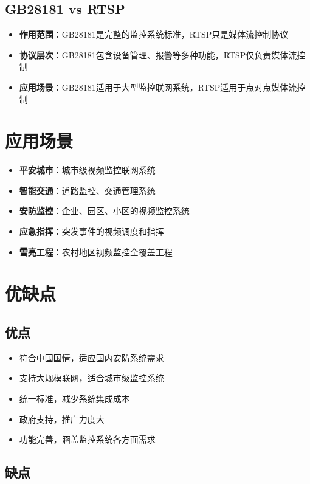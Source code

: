 \documentclass[12pt,UTF8]{ctexbook}
\begin{document}
\section{GB28181 vs RTSP}

\begin{itemize}
  \item \textbf{作用范围}：GB28181是完整的监控系统标准，RTSP只是媒体流控制协议
  \item \textbf{协议层次}：GB28181包含设备管理、报警等多种功能，RTSP仅负责媒体流控制
  \item \textbf{应用场景}：GB28181适用于大型监控联网系统，RTSP适用于点对点媒体流控制
\end{itemize}

\chapter{应用场景}

\begin{itemize}
  \item \textbf{平安城市}：城市级视频监控联网系统
  \item \textbf{智能交通}：道路监控、交通管理系统
  \item \textbf{安防监控}：企业、园区、小区的视频监控系统
  \item \textbf{应急指挥}：突发事件的视频调度和指挥
  \item \textbf{雪亮工程}：农村地区视频监控全覆盖工程
\end{itemize}

\chapter{优缺点}

\section{优点}

\begin{itemize}
  \item 符合中国国情，适应国内安防系统需求
  \item 支持大规模联网，适合城市级监控系统
  \item 统一标准，减少系统集成成本
  \item 政府支持，推广力度大
  \item 功能完善，涵盖监控系统各方面需求
\end{itemize}

\section{缺点}
\end{document}

